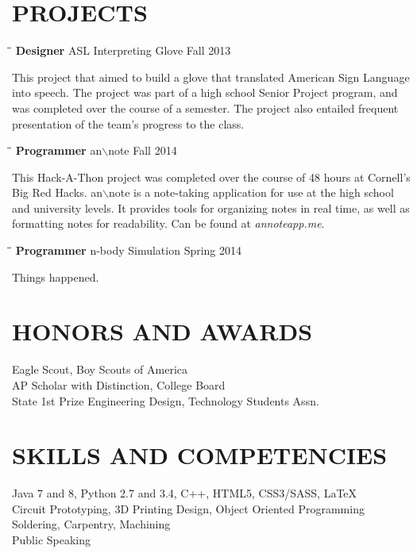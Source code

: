 \documentclass{res}
\begin{document}
\begin{resume}
    
\section{PROJECTS}    
	\vspace{-0.1in}
	\begin{tabbing}
    \hspace{2.3in}\= \hspace{2.4in}\= \kill
    {\bf Designer} \>ASL Interpreting Glove \>Fall 2013\\
  \end{tabbing}\vspace{-30pt}
  This project that aimed to build a glove that translated American Sign Language into speech. The project was part of a high school Senior Project program, and was completed over the course of a semester. The project also entailed frequent presentation of the team's progress to the class.
  \vspace{-10pt}
  \begin{tabbing}
    \hspace{2.3in}\= \hspace{2.4in}\= \kill
    {\bf Programmer} \>an$\backslash$note \>Fall 2014\\
  \end{tabbing}\vspace{-30pt}
  This Hack-A-Thon project was completed over the course of 48 hours at Cornell's Big Red Hacks. an$\backslash$note is a note-taking application for use at the high school and university levels. It provides tools for organizing notes in real time, as well as formatting notes for readability. Can be found at \textit{annoteapp.me}.
  \vspace{-10pt}
  \begin{tabbing}
    \hspace{2.3in}\= \hspace{2.4in}\= \kill
    {\bf Programmer} \>n-body Simulation \>Spring 2014\\
  \end{tabbing}\vspace{-30pt}
  Things happened.
 
\section{HONORS AND AWARDS}
	Eagle Scout, Boy Scouts of America \\
	AP Scholar with Distinction, College Board \\
	State 1st Prize Engineering Design, Technology Students Assn.

\section{SKILLS AND COMPETENCIES}
  Java 7 and 8, Python 2.7 and 3.4, C++, HTML5, CSS3/SASS, \LaTeX \\
  Circuit Prototyping, 3D Printing Design, Object Oriented Programming \\
  Soldering, Carpentry, Machining \\
  Public Speaking
	
\end{resume}
\end{document}
